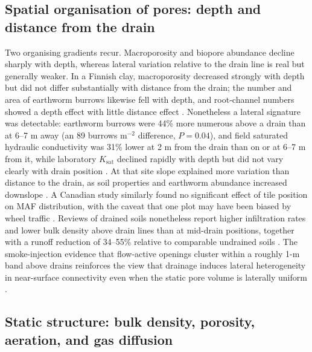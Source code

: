 \subsection{Spatial organisation of pores: depth and distance from the drain}

Two organising gradients recur. Macroporosity and biopore abundance decline sharply
with depth, whereas lateral variation relative to the drain line is real but
generally weaker. In a Finnish clay, macroporosity decreased strongly with depth but
did not differ substantially with distance from the drain; the number and area of
earthworm burrows likewise fell with depth, and root-channel numbers showed a depth
effect with little distance effect \parencite{Alakukku2010}. Nonetheless a lateral
signature was detectable: earthworm burrows were 44\% more numerous above a drain
than at 6--7 m away (an 89 burrows m$^{-2}$ difference, $P = 0.04$), and field
saturated hydraulic conductivity was 31\% lower at 2 m from the drain than on or at
6--7 m from it, while laboratory $K_{\mathrm{sat}}$ declined rapidly with depth but
did not vary clearly with drain position \parencite{Alakukku2010}. At that site slope
explained more variation than distance to the drain, as soil properties and earthworm
abundance increased downslope \parencite{Alakukku2010}. A Canadian study similarly
found no significant effect of tile position on MAF distribution, with the caveat
that one plot may have been biased by wheel traffic \parencite{Frey2011}. Reviews of
drained soils nonetheless report higher infiltration rates and lower bulk density
above drain lines than at mid-drain positions, together with a runoff reduction of
34--55\% relative to comparable undrained soils \parencite{Montagne2009}. The
smoke-injection evidence that flow-active openings cluster within a roughly 1-m band
above drains reinforces the view that drainage induces lateral heterogeneity in
near-surface connectivity even when the static pore volume is laterally uniform
\parencite{Nielsen2015,Petersen2012}.

\subsection{Static structure: bulk density, porosity, aeration, and gas diffusion}

